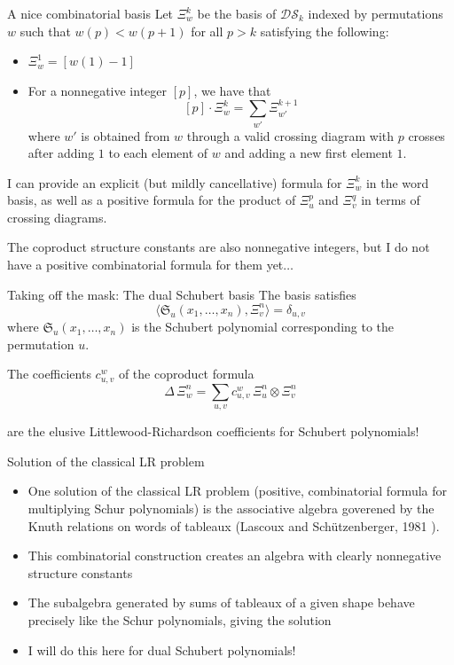 \documentclass[aspectratio=169]{beamer}
\newcommand{\dcoma}{\mathcal{DS}}
\newcommand{\Sch}[1]{\Xi_{#1}}
\begin{document}
\begin{frame}{A nice combinatorial basis}
Let $\Xi_w^k$ be the basis of $\dcoma_k$ indexed by permutations $w$ such that $w(p) < w(p+1)$ for all $p>k$ satisfying the following:
\begin{itemize}
\item $\Xi_{w}^1 = [w(1) - 1]$
\item For a nonnegative integer $[p]$, we have that
$$[p]\cdot\Xi_w^k = \sum_{w'}\Xi_{w'}^{k+1}$$
where $w'$ is obtained from $w$ through a valid crossing diagram with $p$ crosses after adding $1$ to each element of $w$ and adding a new first element $1$. 
\end{itemize}

I can provide an explicit (but mildly cancellative) formula for $\Xi_w^k$ in the word basis, as well as a positive formula for the product of $\Xi_u^p$ and $\Xi_v^q$ in terms of crossing diagrams. 

The coproduct structure constants are also nonnegative integers, but I do not have a positive combinatorial formula for them yet$\ldots$
\end{frame}

\begin{frame}{Taking off the mask: The dual Schubert basis}
The basis satisfies
$$\langle \mathfrak{S}_{u}(x_1,\ldots,x_n), \Xi_{v}^{n} \rangle = \delta_{u,v}$$
where $\mathfrak{S}_{u}(x_1,\ldots,x_n)$ is the Schubert polynomial corresponding to the permutation $u$.

The coefficients $c_{u,v}^{w}$ of the coproduct formula
\[
\Delta\,\Sch{w}^{n} = \sum_{u,v} c_{u,v}^{w}\,\Sch{u}^{n}\otimes \Sch{v}^{n}
\]

are the elusive Littlewood-Richardson coefficients for Schubert polynomials!

\end{frame}

\begin{frame}{Solution of the classical LR problem}
  \begin{itemize}
  \item One solution of the classical LR problem (positive, combinatorial formula for multiplying Schur polynomials) is the associative algebra goverened by the Knuth relations on words of tableaux (Lascoux and Sch\"utzenberger, 1981 \cite{lascoux1981monoide}).
  \item This combinatorial construction creates an algebra with clearly nonnegative structure constants
  \item The subalgebra generated by sums of tableaux of a given shape behave precisely like the Schur polynomials, giving the solution

  \item I will do this here for dual Schubert polynomials!
  \end{itemize}
\end{frame}
\end{document}
